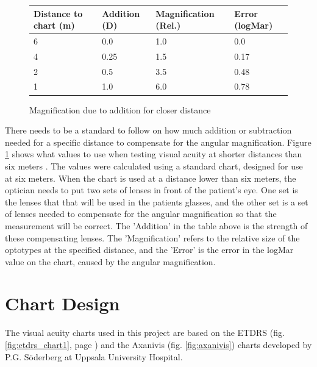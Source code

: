 \documentclass[12pt,a4paper,notitlepage]{report}
\begin{document}
\newpage
\begin{figure}[h]
\centering
\begin{tabular}{| l | l | l | l |}
    \hline
    Distance to chart (m) & Addition (D) & Magnification (Rel.) & Error (logMar) \\ \hline
	6                     & 0.0          & 1.0                  & 0.0            \\ \hline
    4                     & 0.25         & 1.5                  & 0.17           \\ \hline
    2                     & 0.5          & 3.5                  & 0.48           \\ \hline
    1                     & 1.0          & 6.0                  & 0.78           \\ 
    \hline
    \end{tabular}
    \caption{Magnification due to addition for closer distance\label{magtable}}
\end{figure}

There needs to be a standard to follow on how much addition or subtraction needed for a specific distance to compensate for the angular magnification. Figure \ref{magtable} shows what values to use when testing visual acuity at shorter distances than six meters \cite{PGSoderbergOral}. The values were calculated using a standard chart, designed for use at six meters. When the chart is used at a distance lower than six meters, the optician needs to put two sets of lenses in front of the patient's eye. One set is the lenses that that will be used in the patients glasses, and the other set is a set of lenses needed to compensate for the angular magnification so that the measurement will be correct. The 'Addition' in the table above is the strength of these compensating lenses. The 'Magnification' refers to the relative size of the optotypes at the specified distance, and the 'Error' is the error in the logMar value on the chart, caused by the angular magnification.

\section{Chart Design}
The visual acuity charts used in this project are based on the ETDRS (fig. \ref{fig:etdrs_chart1}, page \pageref{fig:etdrs_chart1}) \cite{Ferris} and the Axanivis (fig. \ref{fig:axanivis}) \cite{PGSoderbergOral} charts developed by P.G. Söderberg at Uppsala University Hospital. 

\end{document}
